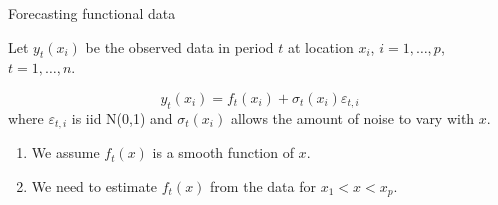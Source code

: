\begin{frame}{Forecasting functional data}

Let $y_t(x_i)$ be the observed data in period $t$ at location $x_i$, $i=1,\dots,p$, $t=1,\dots,n$.
\pause

\begin{block}{}
	$$y_t(x_i) = f_t(x_i) + \sigma_t(x_i)\varepsilon_{t,i}$$
	where $\varepsilon_{t,i}$ is iid N(0,1) and $\sigma_t(x_i)$ allows the amount of noise to vary with $x$.
\end{block}
\pause

\begin{enumerate}[<+-| alert@+>]
	\item We assume $f_t(x)$ is a smooth function of $x$.
	\item We need to estimate $f_t(x)$ from the data for $x_1 < x < x_p$.
\end{enumerate}
\end{frame}




